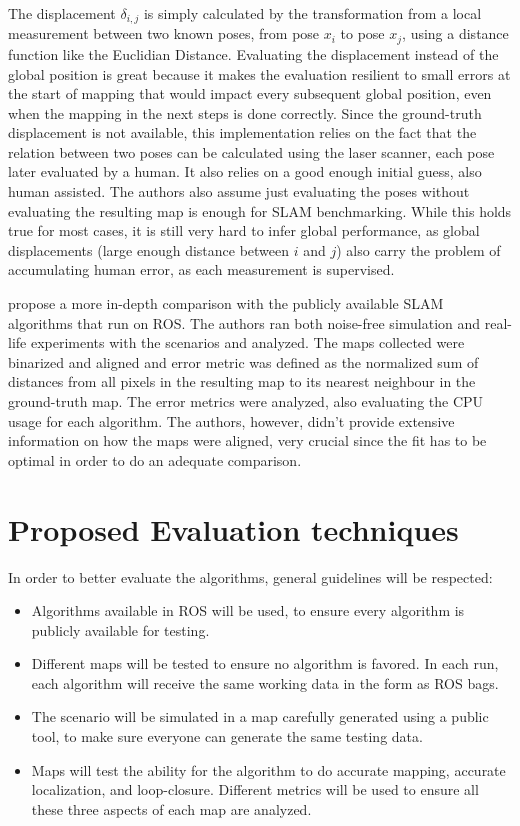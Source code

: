  The displacement $\delta_{i, j}$ is simply calculated by the transformation from a local measurement between two known poses, from pose $x_i$ to pose $x_j$, using a distance function like the Euclidian Distance. Evaluating the displacement instead of the global position is great because it makes the evaluation resilient to small errors at the start of mapping that would impact every subsequent global position, even when the mapping in the next steps is done correctly. Since the ground-truth displacement is not available, this implementation relies on the fact that the relation between two poses can be calculated using the laser scanner, each pose later evaluated by a human. It also relies on a good enough initial guess, also human assisted. The authors also assume just evaluating the poses without evaluating the resulting map is enough for SLAM benchmarking. While this holds true for most cases, it is still very hard to infer global performance, as global displacements (large enough distance between $i$ and $j$) also carry the problem of accumulating human error, as each measurement is supervised.
 
 \citeauthor{santos2013evaluation} propose a more in-depth comparison with the publicly available SLAM algorithms that run on ROS. The authors ran both noise-free simulation and real-life experiments with the scenarios and analyzed. The maps collected were binarized and aligned and error metric was defined as the normalized sum of distances from all pixels in the resulting map to its nearest neighbour in the ground-truth map. The error metrics were analyzed, also evaluating the CPU usage for each algorithm. The authors, however, didn't provide extensive information on how the maps were aligned, very crucial since the fit has to be optimal in order to do an adequate comparison.
 
 \section{Proposed Evaluation techniques}
 
 In order to better evaluate the algorithms, general guidelines will be respected:
 
 \begin{itemize}
     \item Algorithms available in ROS will be used, to ensure every algorithm is publicly available for testing.
     \item Different maps will be tested to ensure no algorithm is favored. In each run, each algorithm will receive the same working data in the form as ROS bags.
     \item The scenario will be simulated in a map carefully generated using a public tool, to make sure everyone can generate the same testing data.
     \item Maps will test the ability for the algorithm to do accurate mapping, accurate localization, and loop-closure. Different metrics will be used to ensure all these three aspects of each map are analyzed.
 \end{itemize}
 
